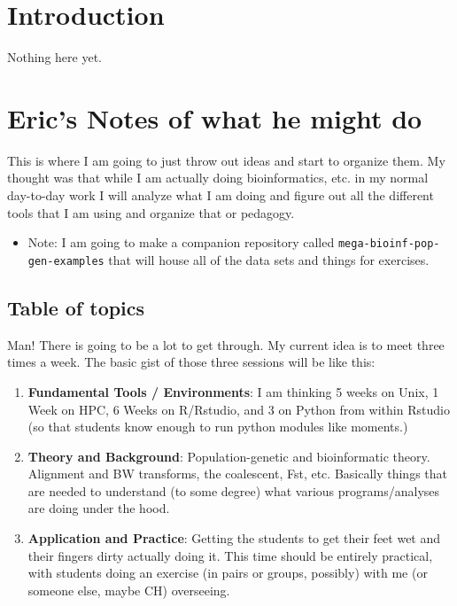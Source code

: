 \documentclass[]{krantz}
\providecommand{\tightlist}{%
  \setlength{\itemsep}{0pt}\setlength{\parskip}{0pt}}
\begin{document}
\hypertarget{intro}{%
\chapter{Introduction}\label{intro}}

Nothing here yet.

\hypertarget{erics-notes-of-what-he-might-do}{%
\chapter{Eric's Notes of what he might do}\label{erics-notes-of-what-he-might-do}}

This is where I am going to just throw out ideas and start to organize them. My thought
was that while I am actually doing bioinformatics, etc. in my normal day-to-day work
I will analyze what I am doing and figure out all the different tools that I am using
and organize that or pedagogy.

\begin{itemize}
\tightlist
\item
  Note: I am going to make a companion repository called \texttt{mega-bioinf-pop-gen-examples}
  that will house all of the data sets and things for exercises.
\end{itemize}

\hypertarget{table-of-topics}{%
\section{Table of topics}\label{table-of-topics}}

Man! There is going to be a lot to get through. My current idea
is to meet three times a week. The basic gist of those three sessions
will be like this:

\begin{enumerate}
\def\labelenumi{\arabic{enumi}.}
\item
  \textbf{Fundamental Tools / Environments}: I am thinking 5 weeks on Unix, 1 Week on HPC, 6 Weeks on R/Rstudio, and 3 on Python from within Rstudio (so that students know enough to run python modules like moments.)
\item
  \textbf{Theory and Background}: Population-genetic and bioinformatic theory. Alignment and BW transforms, the coalescent, Fst, etc. Basically things that are needed to understand (to some degree) what various programs/analyses are doing under the hood.
\item
  \textbf{Application and Practice}: Getting the students to get their feet wet and their fingers dirty actually doing it. This time should be entirely practical, with students doing an exercise (in pairs or groups, possibly) with me (or someone else, maybe CH) overseeing.
\end{enumerate}
\end{document}
